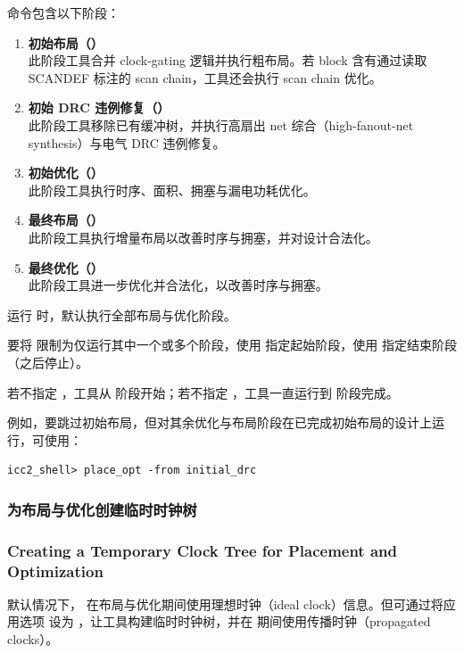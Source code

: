  命令包含以下阶段：
\begin{enumerate}
  \item \textbf{初始布局（）}\\
        此阶段工具合并 clock-gating 逻辑并执行粗布局。若 block 含有通过读取 SCANDEF 标注的 scan chain，工具还会执行 scan chain 优化。
  \item \textbf{初始 DRC 违例修复（）}\\
        此阶段工具移除已有缓冲树，并执行高扇出 net 综合（high-fanout-net synthesis）与电气 DRC 违例修复。
  \item \textbf{初始优化（）}\\
        此阶段工具执行时序、面积、拥塞与漏电功耗优化。
  \item \textbf{最终布局（）}\\
        此阶段工具执行增量布局以改善时序与拥塞，并对设计合法化。
  \item \textbf{最终优化（）}\\
        此阶段工具进一步优化并合法化，以改善时序与拥塞。
\end{enumerate}

运行  时，默认执行全部布局与优化阶段。

要将  限制为仅运行其中一个或多个阶段，使用  指定起始阶段，使用  指定结束阶段（之后停止）。

若不指定 ，工具从  阶段开始；若不指定 ，工具一直运行到  阶段完成。

例如，要跳过初始布局，但对其余优化与布局阶段在已完成初始布局的设计上运行，可使用：
\begin{lstlisting}
icc2_shell> place_opt -from initial_drc
\end{lstlisting}

\subsubsection{为布局与优化创建临时时钟树}
\subsubsection*{Creating a Temporary Clock Tree for Placement and Optimization}

默认情况下， 在布局与优化期间使用理想时钟（ideal clock）信息。但可通过将应用选项  设为 ，让工具构建临时时钟树，并在  期间使用传播时钟（propagated clocks）。

